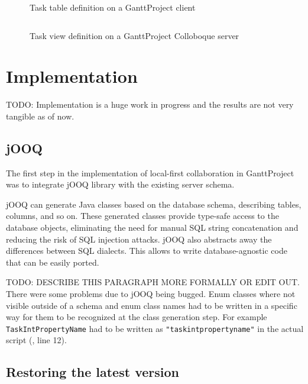 \documentclass[a4paper, 11pt, oneside]{article}
\theoremstyle{definition}
\begin{document}
\begin{figure}
    \inputminted[frame=single,linenos]{sql}{lst/client-database-init.sql}
    \caption{Task table definition on a GanttProject client}
    \label{fig:client-database-init}
\end{figure}

\begin{figure}
    \inputminted[frame=single,linenos,fontsize=\small]{sql}{lst/server-database-init.sql}
    \caption{Task view definition on a GanttProject Colloboque server}
    \label{fig:server-database-init}
\end{figure}


\section{Implementation}

TODO: Implementation is a huge work in progress and the results are not very tangible as of now.

\subsection{jOOQ}

The first step in the implementation of local-first collaboration in GanttProject was to integrate jOOQ library \cite{jooq} with the existing server schema.

jOOQ can generate Java classes based on the database schema, describing tables, columns, and so on. These generated classes provide type-safe access to the database objects, eliminating the need for manual SQL string concatenation and reducing the risk of SQL injection attacks. jOOQ also abstracts away the differences between SQL dialects. This allows to write database-agnostic code that can be easily ported.

TODO: DESCRIBE THIS PARAGRAPH MORE FORMALLY OR EDIT OUT. There were some problems due to jOOQ being bugged. Enum classes where not visible outside of a schema and enum class names had to be written in a specific way for them to be recognized at the class generation step. For example \verb|TaskIntPropertyName| had to be written as \verb|"taskintpropertyname"| in the actual script (, line 12).

\subsection{Restoring the latest version}
\end{document}

